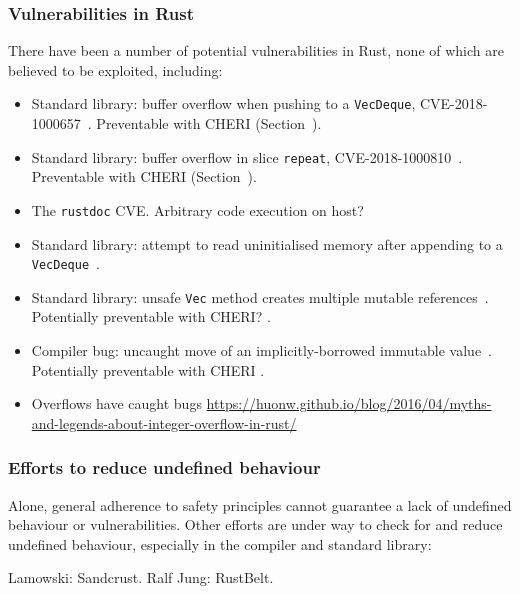 \documentclass[dissertation.tex]{subfiles}
\begin{document}
\subsubsection{Vulnerabilities in Rust}
There have been a number of potential vulnerabilities in Rust, none of
which are believed to be exploited, including:

\begin{itemize}
    \item Standard library: buffer overflow when pushing to a
    \texttt{VecDeque}, CVE-2018-1000657~\cite{cve-push,rust-issue-push}.
    Preventable with CHERI (Section~).
    \item Standard library: buffer overflow in slice \texttt{repeat},
    CVE-2018-1000810~\cite{cve-repeat,rust-advisory-repeat,rust-pr-slice}.
    Preventable with CHERI (Section~).
    \item The \texttt{rustdoc} CVE. Arbitrary code execution on host?
    \item Standard library: attempt to read uninitialised memory after
    appending to a \texttt{VecDeque}~\cite{rust-issue-deque-append}.
    \item Standard library: unsafe \texttt{Vec} method creates
    multiple mutable references~\cite{rust-issue-vec-mut}.
    Potentially preventable with CHERI? .
    \item Compiler bug: uncaught move of an implicitly-borrowed
    immutable value~\cite{rust-issue-match-borrow}.
    Potentially preventable with CHERI .
    \item {} Overflows have caught bugs
    \url{https://huonw.github.io/blog/2016/04/myths-and-legends-about-integer-overflow-in-rust/}
\end{itemize}

\subsubsection{Efforts to reduce undefined behaviour}
Alone, general adherence to safety principles cannot guarantee a lack of
undefined behaviour or vulnerabilities.
Other efforts are under way to check for and reduce undefined behaviour,
especially in the compiler and standard library:

Lamowski: Sandcrust.
Ralf Jung: RustBelt.


\end{document}
